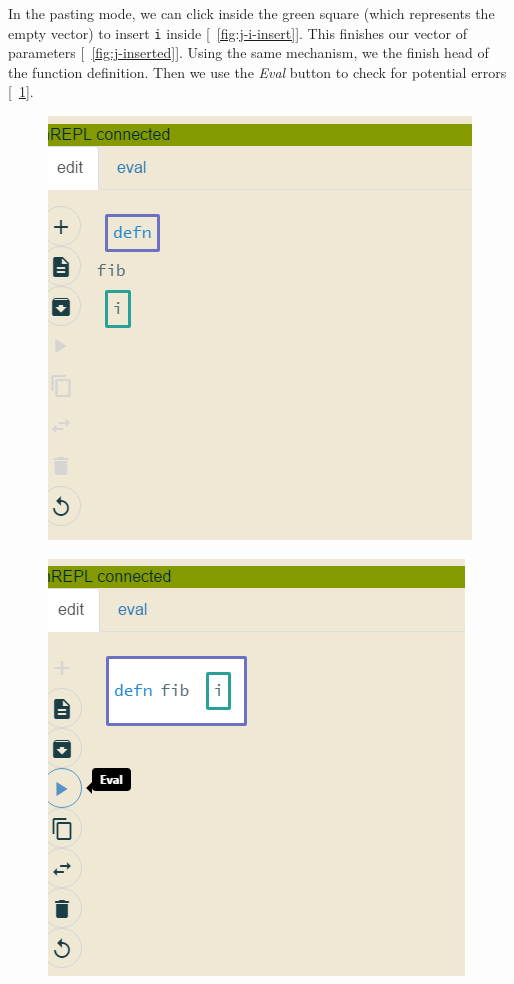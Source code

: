 \documentclass[english,mgr,shortabstract]{iithesis}
\newcommand*{\figref}[1]{[\textbf{\figurename}~\ref{#1}]}
\begin{document}
In the pasting mode, we can click inside the green square (which represents the empty vector) to insert
\lstinline|i| inside \figref{fig:j-i-insert}.
This finishes our vector of parameters \figref{fig:j-inserted}.
Using the same mechanism, we the finish head of the function definition. Then we use
the \textit{Eval}  button to check for potential errors \figref{fig:j-defn-eval}.

\begin{figure}[hbt]
  \centering
  \begin{minipage}{0.48\textwidth}
    \centering
    \includegraphics[scale=0.3]{img/j-inserted}
\label{fig:j-inserted}
  \end{minipage}
  \begin{minipage}{0.48\textwidth}
    \centering
    \includegraphics[scale=0.3]{img/j-defn-eval}
\label{fig:j-defn-eval}
  \end{minipage}
\end{figure}
\end{document}
